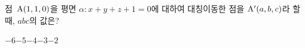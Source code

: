 점~$\mathrm{A}(1{,}\mkern3mu\mathopen{}1{,}\mkern3mu\mathopen{}0)$을 평면 $\alpha\colon x+y+z+1=0$에 대하여 대칭이동한 점을 $\mathrm{A}'(a{,}\mkern3mu\mathopen{}b{,}\mkern3mu\mathopen{}c)$라 할 때, $abc$의 값은?
\begin{choices32}{$-6$}{$-5$}{$-4$}{$-3$}{$-2$}\end{choices32}
